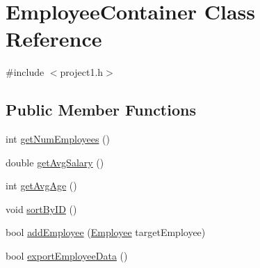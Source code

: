 \hypertarget{class_employee_container}{\section{Employee\-Container Class Reference}
\label{class_employee_container}
}


{\ttfamily \#include $<$project1.\-h$>$}

\subsection*{Public Member Functions}
\begin{DoxyCompactItemize}
\item 
int \hyperlink{class_employee_container_a3d50b73c62d47851a1c49f99eed8704e}{get\-Num\-Employees} ()
\item 
double \hyperlink{class_employee_container_a3100d9a1397ed206181f2a6932aaedf7}{get\-Avg\-Salary} ()
\item 
int \hyperlink{class_employee_container_a54693c873110e1b456d2a24fae79bd1f}{get\-Avg\-Age} ()
\item 
void \hyperlink{class_employee_container_a05f29d7d09f7196c8952165d282bdf25}{sort\-By\-I\-D} ()
\item 
bool \hyperlink{class_employee_container_a19b7afffbd082baed7a547eae5d85677}{add\-Employee} (\hyperlink{class_employee}{Employee} target\-Employee)
\item 
bool \hyperlink{class_employee_container_afb7e8fc9abb3c180a2eb77b2e1d684eb}{export\-Employee\-Data} ()
\end{DoxyCompactItemize}


